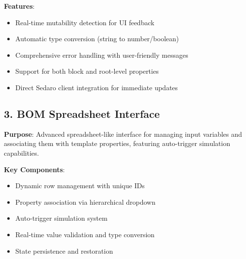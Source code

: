 \documentclass[12pt,a4paper]{article}
\begin{document}
\textbf{Features}:
\begin{itemize}
    \item Real-time mutability detection for UI feedback
    \item Automatic type conversion (string to number/boolean)
    \item Comprehensive error handling with user-friendly messages
    \item Support for both block and root-level properties
    \item Direct Sedaro client integration for immediate updates
\end{itemize}

\subsection{3. BOM Spreadsheet Interface}

\textbf{Purpose}: Advanced spreadsheet-like interface for managing input variables and associating them with template properties, featuring auto-trigger simulation capabilities.

\textbf{Key Components}:
\begin{itemize}
    \item Dynamic row management with unique IDs
    \item Property association via hierarchical dropdown
    \item Auto-trigger simulation system
    \item Real-time value validation and type conversion
    \item State persistence and restoration
\end{itemize}
\end{document}
